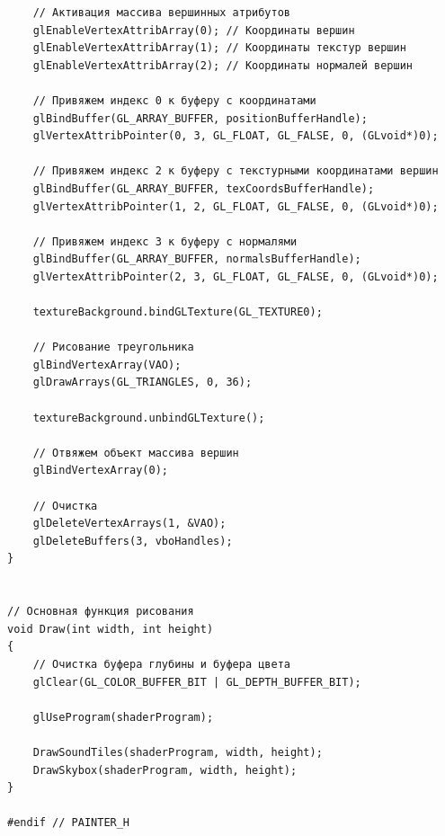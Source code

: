 \documentclass[a4paper,14pt]{extarticle}
\begin{document}
\begin{verbatim}
	// Активация массива вершинных атрибутов
	glEnableVertexAttribArray(0); // Координаты вершин
	glEnableVertexAttribArray(1); // Координаты текстур вершин
	glEnableVertexAttribArray(2); // Координаты нормалей вершин

	// Привяжем индекс 0 к буферу с координатами
	glBindBuffer(GL_ARRAY_BUFFER, positionBufferHandle);
	glVertexAttribPointer(0, 3, GL_FLOAT, GL_FALSE, 0, (GLvoid*)0);

	// Привяжем индекс 2 к буферу с текстурными координатами вершин
	glBindBuffer(GL_ARRAY_BUFFER, texCoordsBufferHandle);
	glVertexAttribPointer(1, 2, GL_FLOAT, GL_FALSE, 0, (GLvoid*)0);

	// Привяжем индекс 3 к буферу с нормалями
	glBindBuffer(GL_ARRAY_BUFFER, normalsBufferHandle);
	glVertexAttribPointer(2, 3, GL_FLOAT, GL_FALSE, 0, (GLvoid*)0);

	textureBackground.bindGLTexture(GL_TEXTURE0);

	// Рисование треугольника
	glBindVertexArray(VAO);
	glDrawArrays(GL_TRIANGLES, 0, 36);

	textureBackground.unbindGLTexture();

	// Отвяжем объект массива вершин
	glBindVertexArray(0);

	// Очистка
	glDeleteVertexArrays(1, &VAO);
	glDeleteBuffers(3, vboHandles);
}


// Основная функция рисования
void Draw(int width, int height)
{
	// Очистка буфера глубины и буфера цвета
	glClear(GL_COLOR_BUFFER_BIT | GL_DEPTH_BUFFER_BIT);

	glUseProgram(shaderProgram);

	DrawSoundTiles(shaderProgram, width, height);
	DrawSkybox(shaderProgram, width, height);
}

#endif // PAINTER_H
\end{verbatim}
\end{document}
